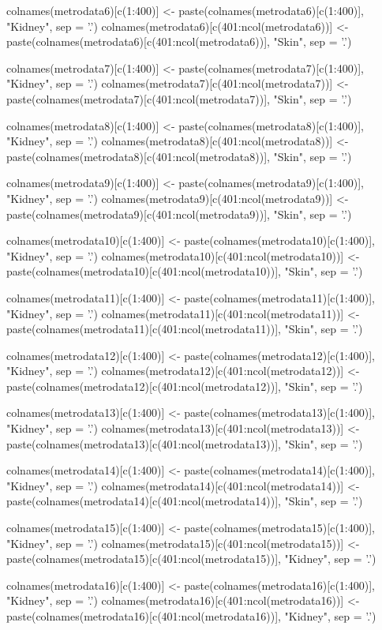 \documentclass[10pt]{article}
\begin{document}
colnames(metrodata6)[c(1:400)] <- paste(colnames(metrodata6)[c(1:400)], "Kidney", sep = '.')
colnames(metrodata6)[c(401:ncol(metrodata6))] <- paste(colnames(metrodata6)[c(401:ncol(metrodata6))], "Skin", sep = '.')

colnames(metrodata7)[c(1:400)] <- paste(colnames(metrodata7)[c(1:400)], "Kidney", sep = '.')
colnames(metrodata7)[c(401:ncol(metrodata7))] <- paste(colnames(metrodata7)[c(401:ncol(metrodata7))], "Skin", sep = '.')

colnames(metrodata8)[c(1:400)] <- paste(colnames(metrodata8)[c(1:400)], "Kidney", sep = '.')
colnames(metrodata8)[c(401:ncol(metrodata8))] <- paste(colnames(metrodata8)[c(401:ncol(metrodata8))], "Skin", sep = '.')

colnames(metrodata9)[c(1:400)] <- paste(colnames(metrodata9)[c(1:400)], "Kidney", sep = '.')
colnames(metrodata9)[c(401:ncol(metrodata9))] <- paste(colnames(metrodata9)[c(401:ncol(metrodata9))], "Skin", sep = '.')

colnames(metrodata10)[c(1:400)] <- paste(colnames(metrodata10)[c(1:400)], "Kidney", sep = '.')
colnames(metrodata10)[c(401:ncol(metrodata10))] <- paste(colnames(metrodata10)[c(401:ncol(metrodata10))], "Skin", sep = '.')

colnames(metrodata11)[c(1:400)] <- paste(colnames(metrodata11)[c(1:400)], "Kidney", sep = '.')
colnames(metrodata11)[c(401:ncol(metrodata11))] <- paste(colnames(metrodata11)[c(401:ncol(metrodata11))], "Skin", sep = '.')

colnames(metrodata12)[c(1:400)] <- paste(colnames(metrodata12)[c(1:400)], "Kidney", sep = '.')
colnames(metrodata12)[c(401:ncol(metrodata12))] <- paste(colnames(metrodata12)[c(401:ncol(metrodata12))], "Skin", sep = '.')

colnames(metrodata13)[c(1:400)] <- paste(colnames(metrodata13)[c(1:400)], "Kidney", sep = '.')
colnames(metrodata13)[c(401:ncol(metrodata13))] <- paste(colnames(metrodata13)[c(401:ncol(metrodata13))], "Skin", sep = '.')

colnames(metrodata14)[c(1:400)] <- paste(colnames(metrodata14)[c(1:400)], "Kidney", sep = '.')
colnames(metrodata14)[c(401:ncol(metrodata14))] <- paste(colnames(metrodata14)[c(401:ncol(metrodata14))], "Skin", sep = '.')

colnames(metrodata15)[c(1:400)] <- paste(colnames(metrodata15)[c(1:400)], "Kidney", sep = '.')
colnames(metrodata15)[c(401:ncol(metrodata15))] <- paste(colnames(metrodata15)[c(401:ncol(metrodata15))], "Kidney", sep = '.')

colnames(metrodata16)[c(1:400)] <- paste(colnames(metrodata16)[c(1:400)], "Kidney", sep = '.')
colnames(metrodata16)[c(401:ncol(metrodata16))] <- paste(colnames(metrodata16)[c(401:ncol(metrodata16))], "Kidney", sep = '.')
\end{document}
